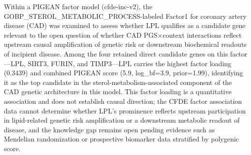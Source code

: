 \documentclass{article}
\begin{document}
Within a PIGEAN factor model (cfde-inc-v2), the GOBP\_STEROL\_METABOLIC\_PROCESS-labeled Factor1 for coronary artery disease (CAD) was examined to assess whether LPL qualifies as a candidate gene relevant to the open question of whether CAD PGS×context interactions reflect upstream causal amplification of genetic risk or downstream biochemical readouts of incipient disease.\cite{dapper:KnowledgeGap.zNV20nhHamt-a4CeAktQQPoAivOJe6xk-r1} Among the four retained direct candidate genes on this factor—LPL, SIRT3, FURIN, and TIMP3—LPL carries the highest factor loading (0.3439) and combined PIGEAN score (5.9, log\_bf=3.9, prior=1.99), identifying it as the top candidate in the sterol-metabolism-associated component of the CAD genetic architecture in this model.\cite{dapper:Claim.oHAogBRdetx6fDiakfRSC0LunxjGDR0E-r1,dapper:Claim.NZs1bmu2UfabvcU9OGLiAWrLIt_XDE61-r1} This factor loading is a quantitative association and does not establish causal direction; the CFDE factor association data cannot determine whether LPL's prominence reflects upstream participation in lipid-related genetic risk amplification or a downstream metabolic readout of disease, and the knowledge gap remains open pending evidence such as Mendelian randomization or prospective biomarker data stratified by polygenic score.\cite{dapper:Claim.NZs1bmu2UfabvcU9OGLiAWrLIt_XDE61-r1}


\end{document}
